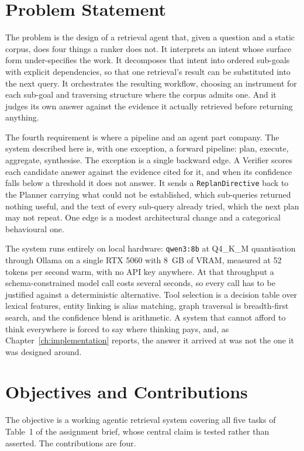 \section{Problem Statement}

The problem is the design of a retrieval agent that, given a question and a
static corpus, does four things a ranker does not. It interprets an intent
whose surface form under-specifies the work. It decomposes that intent into
ordered sub-goals with explicit dependencies, so that one retrieval's result
can be substituted into the next query. It orchestrates the resulting workflow,
choosing an instrument for each sub-goal and traversing structure where the
corpus admits one. And it judges its own answer against the evidence it
actually retrieved before returning anything.

The fourth requirement is where a pipeline and an agent part company. The
system described here is, with one exception, a forward pipeline: plan,
execute, aggregate, synthesise. The exception is a single backward edge. A
Verifier scores each candidate answer against the evidence cited for it, and
when its confidence falls below a threshold it does not answer. It sends a
\texttt{ReplanDirective} back to the Planner carrying what could not be
established, which sub-queries returned nothing useful, and the text of every
sub-query already tried, which the next plan may not repeat. One edge is a
modest architectural change and a categorical behavioural one.

The system runs entirely on local hardware: \texttt{qwen3:8b} at Q4\_K\_M
quantisation through Ollama on a single RTX 5060 with 8~GB of VRAM, measured at
52 tokens per second warm, with no API key anywhere. At that throughput a
schema-constrained model call costs several seconds, so every call has to be
justified against a deterministic alternative. Tool selection is a decision
table over lexical features, entity linking is alias matching, graph traversal
is breadth-first search, and the confidence blend is arithmetic. A system that
cannot afford to think everywhere is forced to say where thinking pays, and, as
Chapter~\ref{ch:implementation} reports, the answer it arrived at was not the
one it was designed around.

\section{Objectives and Contributions}

The objective is a working agentic retrieval system covering all five tasks of
Table~1 of the assignment brief, whose central claim is tested rather than
asserted. The contributions are four.


